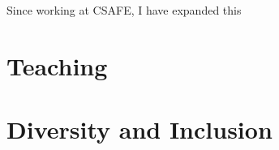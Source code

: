 \documentclass[12pt, letterpaper, sans]{moderncv}
\begin{document}
Since working at CSAFE, I have expanded this 






\section{Teaching}

\section{Diversity and Inclusion}
\end{document}
